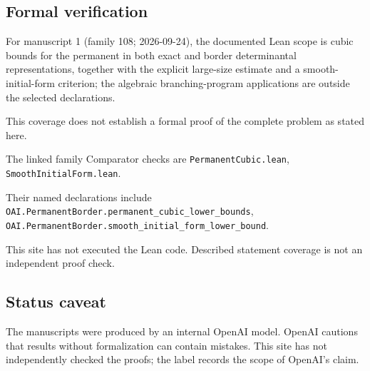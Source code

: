 \documentclass[11pt]{article}
\begin{document}
\subsection{Formal verification}
For manuscript 1 (family 108; 2026-09-24), the documented Lean scope is cubic bounds for the permanent in both exact and border determinantal representations, together with the explicit large-size estimate and a smooth-initial-form criterion; the algebraic branching-program applications are outside the selected declarations.

This coverage does not establish a formal proof of the complete problem as stated here.

The linked family Comparator checks are \texttt{PermanentCubic.lean}, \texttt{SmoothInitialForm.lean}.

Their named declarations include \texttt{OAI.PermanentBorder.permanent\_cubic\_lower\_bounds}, \texttt{OAI.PermanentBorder.smooth\_initial\_form\_lower\_bound}.

This site has not executed the Lean code. Described statement coverage is not an independent proof check.

\subsection{Status caveat}
The manuscripts were produced by an internal OpenAI model. OpenAI cautions that results without formalization can contain mistakes. This site has not independently checked the proofs; the label records the scope of OpenAI's claim.
\end{document}
